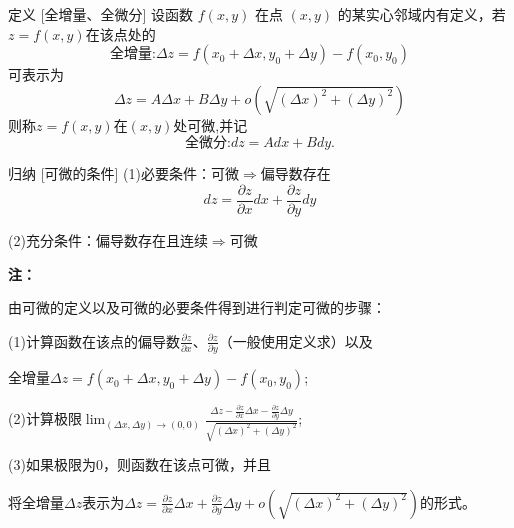 \documentclass[a4paper,12pt,oneside,fontset=none]{ctexbook}
\let\oldlim\lim
\renewcommand{\lim}{\displaystyle\oldlim}
\newenvironment{induction}[1][]{\begin{thmBox}{归纳}{#1}}{\end{thmBox}}
\newcounter{definition}[chapter]
\newenvironment{definition}[1][]{\begin{defBox}{定义}{#1}}{\end{defBox}}
\newenvironment{note}{
    \par\vspace{0.5em}\noindent
    \textbf{\color{NoteColor} 注：}
}{
    \par\vspace{0.5em}
}
\numberwithin{equation}{chapter}
\begin{document}
\begin{definition}
    [全增量、全微分]
    设函数 $f(x,y)$ 在点 $(x,y)$ 的某实心邻域内有定义，若$z=f(x,y)$在该点处的
    $$\textbf{全增量:}\Delta z = f(x_0+\Delta x,y_0+\Delta y) - f(x_0,y_0)$$
    可表示为$$\Delta z = A\Delta x + B\Delta y + o(\sqrt{(\Delta x)^2 + (\Delta y)^2})$$
    则称$z=f(x,y)$在$(x,y)$处可微,并记$$\textbf{全微分:}dz = Adx + Bdy.$$
\end{definition}
\begin{induction}
    [可微的条件]
    (1)必要条件：可微$\Rightarrow$偏导数存在
    $$dz = \frac{\partial z}{\partial x}dx + \frac{\partial z}{\partial y}dy$$
    
    (2)充分条件：偏导数存在且连续$\Rightarrow$可微
\end{induction}
\begin{note}
    由可微的定义以及可微的必要条件得到进行判定可微的步骤：
    
    (1)计算函数在该点的偏导数$\frac{\partial z}{\partial x}$、$\frac{\partial z}{\partial y}$（一般使用定义求）以及
    
    全增量$\Delta z = f(x_0+\Delta x,y_0+\Delta y) - f(x_0,y_0)$;

    (2)计算极限$\lim_{(\Delta x,\Delta y) \to (0,0)} \frac{\Delta z - \frac{\partial z}{\partial x}\Delta x - \frac{\partial z}{\partial y}\Delta y}{\sqrt{(\Delta x)^2 + (\Delta y)^2}}$;

    (3)如果极限为0，则函数在该点可微，并且
    
    将全增量$\Delta z$表示为$\Delta z = \frac{\partial z}{\partial x}\Delta x + \frac{\partial z}{\partial y}\Delta y + o(\sqrt{(\Delta x)^2 + (\Delta y)^2})$的形式。
\end{note}
\end{document}
